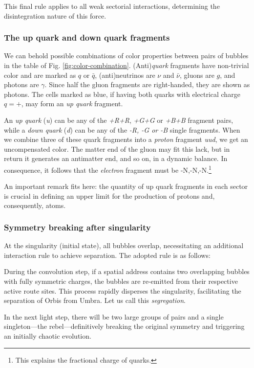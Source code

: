 \documentclass[12pt,english]{article}
\begin{document}
This final rule applies to all weak sectorial interactions, determining the disintegration nature of this force.

\subsubsection{The up quark and down quark fragments}

We can behold possible combinations of color properties between pairs of bubbles in the table of Fig. \ref{fig:color-combination}. (Anti)\emph{quark} fragments have non-trivial color and are marked as $q$ or $\bar{q}$, (anti)neutrinos are $\nu$ and $\bar{\nu}$, gluons are $g$, and photons are $\gamma$. Since half the gluon fragments are right-handed, they are shown as photons. The cells marked as blue, if having both quarks with electrical charge $q=+$, may form an \emph{up quark}
fragment. 

An \emph{up quark} (\emph{u}) can be any of the \emph{+R+R}, \emph{+G+G} or \emph{+B+B} fragment pairs, while a \emph{down quark} (\emph{d}) can be any of the \emph{-R, -G or -B }single fragments. When we combine three of these quark fragments into a \emph{proton} fragment \emph{uud}, we get an uncompensated color. The matter end of the gluon may fit this lack, but in return it generates an antimatter end, and so on, in a dynamic balance. In consequence, it follows that the \emph{electron} fragment must be -N,-N,-N.\footnote{This explains the fractional charge of quarks.} 

An important remark fits here: the quantity of up quark fragments in each sector is crucial in defining an upper limit for the production of protons and, consequently, atoms.

\subsubsection{Symmetry breaking after singularity}

At the singularity (initial state), all bubbles overlap, necessitating an additional interaction rule to achieve separation. The adopted rule is as follows:

During the convolution step, if a spatial address contains two overlapping bubbles with fully symmetric charges, the bubbles are re-emitted from their respective active route sites. This process rapidly disperses the singularity, facilitating the separation of Orbis from Umbra. Let us call this \textit{segregation}.

In the next light step, there will be two large groups of pairs and a single singleton—the rebel—definitively breaking the original symmetry and triggering an initially chaotic evolution.
\end{document}
